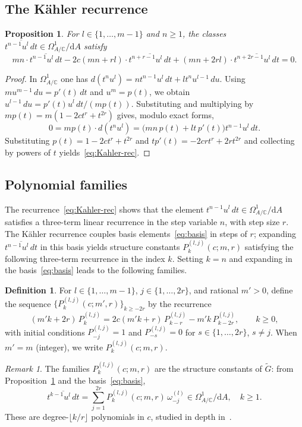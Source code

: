 \documentclass[12pt]{article}
\theoremstyle{plain}
\newtheorem{proposition}[theorem]{Proposition}
\theoremstyle{definition}
\newtheorem{definition}[theorem]{Definition}
\theoremstyle{remark}
\newtheorem{remark}[theorem]{Remark}
\newcommand{\C}{\mathbb{C}}
\newcommand{\gtil}{\widetilde{G}}
\newcommand{\dR}{\mathrm{d}A}
\newcommand{\OmegaA}{\Omega^{1}_{A/\C}}
\newcommand{\Plk}[2]{P^{(#1)}_{#2}}
\begin{document}
\subsection{The K\"{a}hler recurrence}
\begin{proposition}\label{prop:Kahler-rec}
  For $l\in\{1,\ldots,m-1\}$ and $n\geq 1$, the classes
  $\overline{t^{n-1}u^l\,dt}\in\OmegaA/\dR$ satisfy
  \begin{equation}\label{eq:Kahler-rec}
    mn\cdot\overline{t^{n-1}u^l\,dt}
    -2c(mn+rl)\cdot\overline{t^{n+r-1}u^l\,dt}
    +(mn+2rl)\cdot\overline{t^{n+2r-1}u^l\,dt} = 0.
  \end{equation}
\end{proposition}
\begin{proof}
  In $\OmegaA$ one has $d(t^nu^l)=nt^{n-1}u^l\,dt+lt^nu^{l-1}\,du$.
  Using $mu^{m-1}\,du=p'(t)\,dt$ and $u^m=p(t)$, we obtain
  $u^{l-1}\,du = p'(t)u^l\,dt/(mp(t))$.
  Substituting and multiplying by $mp(t)=m(1-2ct^r+t^{2r})$ gives,
  modulo exact forms,
  \[
    0 = mp(t)\cdot d(t^nu^l)
      = \bigl(mn\,p(t) + lt\,p'(t)\bigr)t^{n-1}u^l\,dt.
  \]
  Substituting $p(t)=1-2ct^r+t^{2r}$ and $tp'(t)=-2crt^r+2rt^{2r}$
  and collecting by powers of $t$ yields~\eqref{eq:Kahler-rec}.
\end{proof}
\subsection{Polynomial families}\label{subsec:polyfam}
The recurrence~\eqref{eq:Kahler-rec} shows that the element
$t^{n-1}u^l\,dt \in \OmegaA/\dR$ satisfies a three-term linear recurrence
in the step variable $n$, with step size $r$.
The K\"{a}hler recurrence couples basis elements~\eqref{eq:basis} in steps of $r$;
expanding $\overline{t^{n-1}u^l\,dt}$ in this basis yields structure constants
$\Plk{l,j}{k}(c;m,r)$ satisfying the following three-term recurrence in the index $k$.
Setting $k=n$ and expanding in the basis~\eqref{eq:basis} leads to the
following families.
\begin{definition}\label{def:polyfamilies}
  For $l\in\{1,\ldots,m-1\}$, $j\in\{1,\ldots,2r\}$, and rational $m'>0$,
  define the sequence $\{\Plk{l,j}{k}(c;m',r)\}_{k\geq -2r}$ by the recurrence
  \begin{equation}\label{eq:rec}
    (m'k+2r)\,\Plk{l,j}{k} = 2c(m'k+r)\,\Plk{l,j}{k-r} - m'k\,\Plk{l,j}{k-2r},
    \qquad k\geq 0,
  \end{equation}
  with initial conditions $\Plk{l,j}{-j}=1$ and $\Plk{l,j}{-s}=0$ for
  $s\in\{1,\ldots,2r\}$, $s\neq j$.
  When $m'=m$ (integer), we write $\Plk{l,j}{k}(c;m,r)$.
\end{definition}
\begin{remark}
  The families $\Plk{l,j}{k}(c;m,r)$ are the structure constants of $\gtil$:
  from Proposition~\ref{prop:Kahler-rec} and the basis~\eqref{eq:basis},
  \begin{equation}\label{eq:structure-const}
    \overline{t^{k-1}u^l\,dt} = \sum_{j=1}^{2r}\Plk{l,j}{k}(c;m,r)\,\omega^{(l)}_{-j}
    \in \OmegaA/\dR,\quad k\geq 1.
  \end{equation}
  These are degree-$\lfloor k/r\rfloor$ polynomials in $c$, studied in
  depth in~\cite{CoxFutorny-JDE,SNF-I, SNF-II}.
\end{remark}
\end{document}
